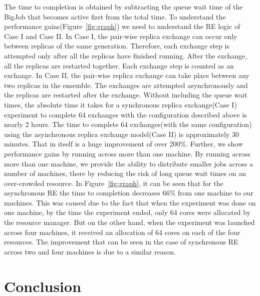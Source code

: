 \documentclass[a4paper,10pt]{article}
\newcommand{\athotanote}[1]{ {\textcolor{green} { ***athota: #1 }}}
\newcommand{\athotanote}[1]{}
\begin{document}
The time to completion is obtained by subtracting the queue wait time of the BigJob that becomes active first from the total time. To understand the performance gains(Figure~\ref{fig:graph}) we need to understand the RE logic of Case I and Case II. In Case I, the pair-wise replica exchange can occur only between replicas of the same generation. Therefore, each exchange step is attempted only after all the replicas have finished running. After the exchange, all the replicas are restarted together. Each exchange step is counted as an exchange.
In Case II, the pair-wise replica exchange can take place between any two replicas in the ensemble. The exchanges are attempted asynchronously and the replicas are restarted after the exchange.
Without including the queue wait times,  the absolute time it takes for a synchronous replica exchange(Case I) experiment to complete 64 exchanges with the configuration described above is nearly 2 hours. The time to complete 64 exchanges(with the same configuration) using the asynchronous replica exchange model(Case II) is approximately 30 minutes. That in itself is a huge improvement of over 200\%. Further, we show performance gains by running across more than one machine. By running across more than one machine, we provide the ability to distribute smaller jobs across a number of machines, there by reducing the risk of long queue wait times on an over-crowded resource. In Figure~\ref{fig:graph}, it can be seen that for the asynchronous RE the time to completion decreases 66\% from one machine to our machines. This was caused due to the fact that when the experiment was done on one machine, by the time the experiment ended, only 64 cores were allocated by the resource manager. But on the other hand, when the experiment was launched across four machines, it received an allocation of 64 cores on each of the four resources. The improvement that can be seen in the case of synchronous RE across two and four machines is due to a similar reason.


\section{Conclusion}



\end{document}
